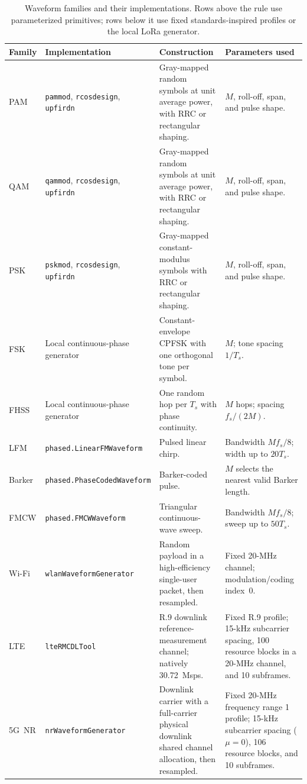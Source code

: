 \documentclass[10pt,conference,letterpaper]{IEEEtran}
\begin{document}
\begin{table}[t]
\centering
\caption{Waveform families and their implementations. Rows above the rule use parameterized primitives; rows below it use fixed standards-inspired profiles or the local LoRa generator.}
\label{tab:waveforms}
\scriptsize
\begin{tabularx}{\textwidth}{@{}p{}p{}X p{}@{}}
\toprule
Family & Implementation & Construction & Parameters used \\
\midrule
PAM & \texttt{pammod}, \texttt{rcosdesign}, \texttt{upfirdn} & Gray-mapped random symbols at unit average power, with RRC or rectangular shaping. & $M$, roll-off, span, and pulse shape. \\
QAM & \texttt{qammod}, \texttt{rcosdesign}, \texttt{upfirdn} & Gray-mapped random symbols at unit average power, with RRC or rectangular shaping. & $M$, roll-off, span, and pulse shape. \\
PSK & \texttt{pskmod}, \texttt{rcosdesign}, \texttt{upfirdn} & Gray-mapped constant-modulus symbols with RRC or rectangular shaping. & $M$, roll-off, span, and pulse shape. \\
FSK & Local continuous-phase generator & Constant-envelope CPFSK with one orthogonal tone per symbol. & $M$; tone spacing $1/T_s$. \\
FHSS & Local continuous-phase generator & One random hop per $T_s$ with phase continuity. & $M$ hops; spacing $f_s/(2M)$. \\
LFM & \texttt{phased.}\allowbreak\texttt{LinearFMWaveform} & Pulsed linear chirp. & Bandwidth $Mf_s/8$; width up to $20T_s$. \\
Barker & \texttt{phased.}\allowbreak\texttt{PhaseCoded}\allowbreak\texttt{Waveform} & Barker-coded pulse. & $M$ selects the nearest valid Barker length. \\
FMCW & \texttt{phased.}\allowbreak\texttt{FMCWWaveform} & Triangular continuous-wave sweep. & Bandwidth $Mf_s/8$; sweep up to $50T_s$. \\
\midrule
Wi-Fi & \texttt{wlanWaveform}\allowbreak\texttt{Generator} & Random payload in a high-efficiency single-user packet, then resampled. & Fixed 20-MHz channel; modulation/coding index~0. \\
LTE & \texttt{lteRMCDL}\allowbreak\texttt{Tool} & R.9 downlink reference-measurement channel; natively 30.72~Msps. & Fixed R.9 profile; 15-kHz subcarrier spacing, 100 resource blocks in a 20-MHz channel, and 10 subframes. \\
5G~NR & \texttt{nrWaveform}\allowbreak\texttt{Generator} & Downlink carrier with a full-carrier physical downlink shared channel allocation, then resampled. & Fixed 20-MHz frequency range 1 profile; 15-kHz subcarrier spacing ($\mu=0$), 106 resource blocks, and 10 subframes. \\

\end{tabularx}
\end{table}
\end{document}
